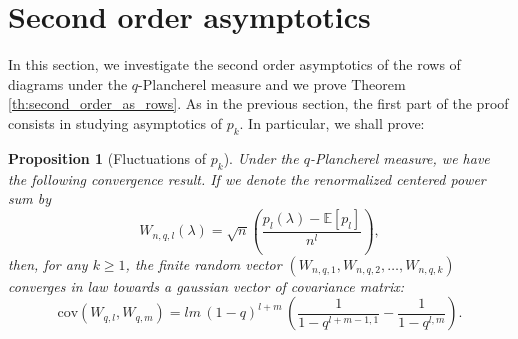 \documentclass[10pt]{amsart}
\newtheorem{proposition}[theorem]{Proposition}
\theoremstyle{remark}
\newtheorem{remark}{Remark}
\newcommand{\C}{\mathbb{C}}
\newcommand{\IH}{\mathscr{H}}
\newcommand{\hendo}{\mathrm{End}}
\newcommand{\leb}{\mathrm{L}}
\newcommand{\GL}{\mathrm{GL}}
\newcommand{\GLB}{\mathrm{GLB}}
\newcommand{\GB}{\mathrm{B}}
\newcommand{\For}{\mathbb{F}}
\newcommand{\esper}{\mathbb{E}}
\begin{document}



\section{Second order asymptotics}\label{sect:second_order}

In this section, we investigate the second order asymptotics of the rows of diagrams under the $q$-Plancherel measure and we prove Theorem \ref{th:second_order_as_rows}. As in the previous section, the first part of the proof consists in studying asymptotics of $p_k$. In particular, we shall prove:

\begin{proposition}[Fluctuations of $p_k$]\label{prop:deviation_powersums}
Under the $q$-Plancherel measure, we have the following convergence result. If we denote the renormalized centered power sum by
$$W_{n,q,l}(\lambda)=\sqrt{n}\left(\frac{p_l(\lambda)-\esper[p_l]}{n^l}\right),$$
then, for any $k \geq 1$, the finite random vector $(W_{n,q,1},W_{n,q,2},\ldots,W_{n,q,k})$ converges in law towards a gaussian vector of covariance matrix:
$$\mathrm{cov}(W_{q,l},W_{q,m})=lm\,(1-q)^{l+m}\,\left(\frac{1}{1-q^{l+m-1,1}}-\frac{1}{1-q^{l,m}}\right).$$
\end{proposition}\bigskip 
\end{document}

